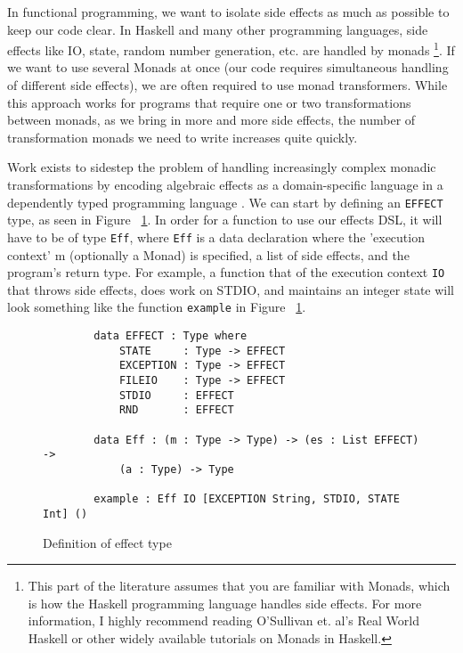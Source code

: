 In functional programming, we want to isolate side effects as much as possible
to keep our code clear. In Haskell and many other programming languages, side
effects like IO, state, random number generation, etc. are handled by monads
\cite{realworldhaskell}\footnote{This part of the literature assumes that you
are familiar with Monads, which is how the Haskell programming language handles
side effects. For more information, I highly recommend reading O'Sullivan et.
al's Real World Haskell or other widely available tutorials on Monads in
Haskell.}. If we want to use several Monads at once (our code requires
simultaneous handling of different side effects), we are often required to use
monad transformers. While this approach works for programs that require one or
two transformations between monads, as we bring in more and more side effects,
the number of transformation monads we need to write increases quite quickly. 

Work exists to sidestep the problem of handling increasingly complex monadic
transformations by encoding algebraic effects as a domain-specific language in a
dependently typed programming language \cite{algebraic}. We can start by
defining an \texttt{EFFECT} type, as seen in Figure ~\ref{effects_def}. In order
for a function to use our effects DSL, it will have to be of type \texttt{Eff},
where \texttt{Eff} is a data declaration where the 'execution context' m (optionally a
Monad) is specified, a list of side effects, and the program's return type. For
example, a function that of the execution context \texttt{IO} that throws side
effects, does work on STDIO, and maintains an integer state will look something
like the function \texttt{example} in Figure ~\ref{effects_def}. 

\begin{figure}[ht!!!!]
    \caption{Definition of effect type}
    \label{effects_def}
    \begin{lstlisting}
        data EFFECT : Type where
            STATE     : Type -> EFFECT
            EXCEPTION : Type -> EFFECT
            FILEIO    : Type -> EFFECT
            STDIO     : EFFECT
            RND       : EFFECT
        
        data Eff : (m : Type -> Type) -> (es : List EFFECT) -> 
            (a : Type) -> Type
    
        example : Eff IO [EXCEPTION String, STDIO, STATE Int] ()
    \end{lstlisting}
\end{figure}

